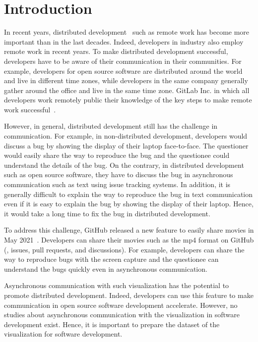 \section{Introduction}
\label{sec:intro}
In recent years, distributed development~\citep{sengupta2006ICSE} 
such as remote work has become more important 
than in the last decades. 
Indeed, developers in industry also employ remote work
in recent years.
To make distributed development successful, 
developers have to be aware of their communication 
in their communities. 
For example, developers for open source software are 
distributed around the world and live in different time zones, 
while developers in the same company generally gather around 
the office and live in the same time zone. 
GitLab Inc. in which all developers work remotely 
public their knowledge of the key steps 
to make remote work successful~\citep{gitlab2020remoteplaybook}. 


However, in general, distributed development still has 
the challenge in communication. 
For example, in non-distributed development, 
developers would discuss a bug by showing the display of 
their laptop face-to-face. 
The questioner would easily share the way to reproduce the bug 
and the questionee could understand the details of the bug. 
On the contrary, in distributed development such as 
open source software, they have to discuss the bug 
in asynchronous communication 
such as text using issue tracking systems. 
In addition, it is generally difficult to explain the way 
to reproduce the bug in text communication 
even if it is easy to explain the bug by showing 
the display of their laptop. 
Hence, it would take a long time to fix the bug 
in distributed development. 


To address this challenge, GitHub released a new feature 
to easily share movies in May 2021~\citep{github-video-blog}. 
Developers can share their movies such as the mp4 format 
on GitHub (\eg,  issues, pull requests, and discussions). 
For example, developers can share the way to reproduce bugs 
with the screen capture and the questionee can understand 
the bugs quickly even in asynchronous communication. 


Asynchronous communication with 
such visualization
has the potential 
to promote distributed development. 
Indeed, developers can use this feature to make communication 
in open source software development accelerate. 
However, no studies about asynchronous communication with 
the visualization in software development exist.
Hence, it is important to prepare the dataset of the visualization
for software development. 


